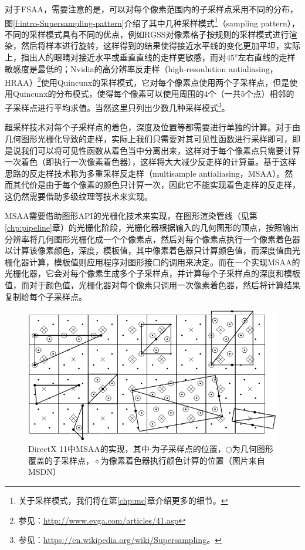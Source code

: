 对于FSAA，需要注意的是，可以对每个像素范围内的子采样点采用不同的分布，图\ref{f:intro-Supersampling-pattern}介绍了其中几种采样模式\footnote{关于采样模式，我们将在第\ref{chp:mc}章介绍更多的细节。}（sampling pattern），不同的采样模式具有不同的优点，例如RGSS对像素格子按规则的采样模式进行渲染，然后将样本进行旋转，这样得到的结果使得接近水平线的变化更加平坦，实际上，\cite{a:Jaggededges:whenisfilteringneeded?}指出人的眼睛对接近水平或垂直直线的走样更敏感，而对$45^{o}$左右直线的走样敏感度是最低的；Nvidia的高分辨率反走样（high-resoulution antialiasing，HRAA）\footnote{参见：\url{http://www.evga.com/articles/41.asp}}使用Quincunx的采样模式，它对每个像素点使用两个子采样点，但是使用Quincunx的分布模式，使得每个像素可以使用周围的4个（一共5个点）相邻的子采样点进行平均求值。当然这里只列出少数几种采样模式\footnote{参见：\url{https://en.wikipedia.org/wiki/Supersampling}。}。

超采样技术对每个子采样点的着色，深度及位置等都需要进行单独的计算。对于由几何图形光栅化导致的走样，实际上我们只需要对其可见性函数进行采样即可，即是说我们可以将可见性函数从着色当中分离出来，这样对于每个像素点只需要计算一次着色（即执行一次像素着色器），这样将大大减少反走样的计算量。基于这样思路的反走样技术称为多重采样反走样（multisample antialiasing，MSAA）。然而其代价是由于每个像素的颜色只计算一次，因此它不能实现着色走样的反走样，这仍然需要借助多级纹理等技术来实现。

MSAA需要借助图形API的光栅化技术来实现，在图形渲染管线（见第\ref{chp:pipeline}章）的光栅化阶段，光栅化器根据输入的几何图形的顶点，按照输出分辨率将几何图形光栅化成一个个像素点，然后对每个像素点执行一个像素着色器以计算该像素颜色，深度，模板值，其中像素着色器只计算颜色值，而深度值由光栅化器计算，模板值则应用程序对图形接口的调用来决定。而在一个实现MSAA的光栅化器，它会对每个像素生成多个子采样点，并计算每个子采样点的深度和模板值，而对于颜色值，光栅化器对每个像素只调用一次像素着色器，然后将计算结果复制给每个子采样点。

\begin{figure}
	\includegraphics[width=1.\textwidth]{figures/intro/msaa}
	\caption{DirectX 11中MSAA的实现，其中$\cdot$为子采样点的位置，$\bigcirc$为几何图形覆盖的子采样点，$\diamond$为像素着色器执行颜色计算的位置（图片来自MSDN）}
	\label{f:intro-msaa}
\end{figure}

